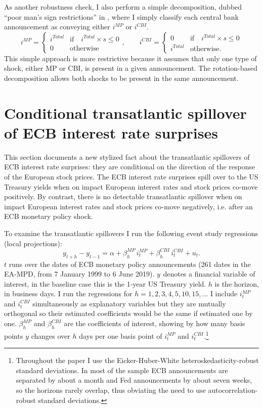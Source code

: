 \documentclass[a4paper,12pt]{article}
\begin{document}
As another robustness check, I also perform a simple decomposition, dubbed ``poor man's sign restrictions'' in \cite{Jarocinski_Karadi_2020}, where
I simply classify each central bank announcement as conveying either $i^{MP}$ or $i^{CBI}$.
\begin{equation}
i^{MP} = \begin{cases} i^{Total} &\text{if} \quad  i^{Total}\times s\le0\\ 0 &\text{otherwise}\end{cases},\qquad
i^{CBI} = \begin{cases} 0 &\text{if} \quad  i^{Total}\times s\le0\\ i^{Total} &\text{otherwise.}\end{cases}
\end{equation}
This simple approach is more restrictive because it assumes that only one type of shock, either
MP or CBI, is present in a given announcement. The rotation-based decomposition
allows both shocks to be present in the same announcement.

\section{Conditional transatlantic spillover of ECB interest rate surprises}

This section documents a new stylized fact about the transatlantic spillovers of ECB interest rate
surprises: they are conditional on the direction of the response of the European stock prices.
The ECB interest rate surprises spill over to the US Treasury yields
when on impact European interest rates and stock prices co-move positively.
By contrast, there is no detectable transatlantic spillover when on impact
European interest rates and stock prices co-move negatively, i.e. after an ECB monetary policy shock.

To examine the transatlantic spillovers I run the following event study regressions (local projections):
\begin{equation}
y^{}_{t+h}-y^{}_{t-1} = \alpha + \beta^{MP}_h\, i^{MP}_t + \beta^{CBI}_h\, i^{CBI}_t + u_t.\label{eq: event study reg 2}
\end{equation}
$t$ runs over the dates of ECB monetary policy announcements (261 dates in the EA-MPD, from 7 January 1999 to 6 June 2019). $y^{}$ denotes a financial variable of interest, in the baseline case this is the 1-year US Treasury yield. 
$h$ is the horizon, in business days. I run the regressions for $h=1,2,3,4,5,10,15,...$
I include $i^{MP}_t$ and $i^{CBI}_t$ simultaneously as explanatory variables but they are mutually orthogonal so their estimated coefficients would be the same if estimated one by one.
$\beta_h^{MP}$ and $\beta_h^{CBI}$ are the coefficients of interest, showing by how many basis points $y$ changes over $h$ days per one basis point of $i^{MP}_t$ and $i^{CBI}_t$.\footnote{Throughout the paper I use the Eicker-Huber-White heteroskedasticity-robust standard deviations. In most of the sample ECB announcements are separated by about a month and Fed announcements by about seven weeks, so the horizons rarely overlap, thus obviating the need to use autocorrelation-robust standard deviations.}
\end{document}
